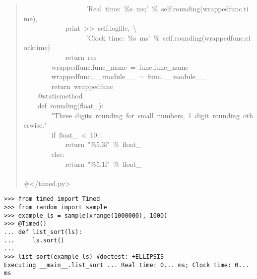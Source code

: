\documentclass[10pt,a4paper,english]{article}
\begin{document}
\begin{quote}
{~~~~~~~~~~~~~~~~~~'Real~time:~{\%}s~ms;'~{\%}~self.rounding(wrappedfunc.time),~\\
~~~~~~~~~~~~print~>{}>~self.logfile,~{\textbackslash}~\\
~~~~~~~~~~~~~~~~~~'Clock~time:~{\%}s~ms'~{\%}~self.rounding(wrappedfunc.clocktime)~\\
~~~~~~~~~~~~return~res~\\
~~~~~~~~wrappedfunc.func{\_}name~=~func.func{\_}name~\\
~~~~~~~~wrappedfunc.{\_}{\_}module{\_}{\_}~=~func.{\_}{\_}module{\_}{\_}~\\
~~~~~~~~return~wrappedfunc~\\
~~~~@staticmethod~\\
~~~~def~rounding(float{\_}):~\\
~~~~~~~~"Three~digits~rounding~for~small~numbers,~1~digit~rounding~otherwise."~\\
~~~~~~~~if~float{\_}~<~10.:~\\
~~~~~~~~~~~~return~"{\%}5.3f"~{\%}~float{\_}~\\
~~~~~~~~else:~\\
~~~~~~~~~~~~return~"{\%}5.1f"~{\%}~float{\_}~\\
~~~~\\
{\#}</timed.py>
}\end{quote}
\begin{verbatim}>>> from timed import Timed
>>> from random import sample
>>> example_ls = sample(xrange(1000000), 1000)
>>> @Timed()
... def list_sort(ls):
...     ls.sort()
... 
>>> list_sort(example_ls) #doctest: +ELLIPSIS
Executing __main__.list_sort ... Real time: 0... ms; Clock time: 0... ms\end{verbatim}



\hypertarget{a-powerful-decorator-pattern}{}
\end{document}

